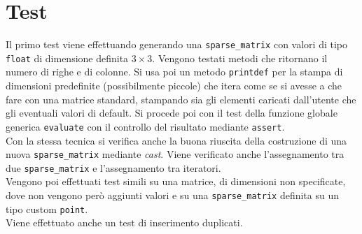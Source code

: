 \documentclass[a4paper,12pt, oneside]{article}
\begin{document}
\section*{Test}
Il primo test viene effettuando generando una \texttt{sparse\_matrix}
con valori di tipo \texttt{float} di dimensione definita $3\times
3$. Vengono testati metodi che ritornano il numero di righe e di
colonne. Si usa poi un metodo \texttt{printdef} per la stampa di
dimensioni predefinite (possibilmente piccole) che itera come se si
avesse a che fare con una matrice standard, stampando sia gli elementi
caricati dall'utente che gli eventuali valori di default. Si procede
poi con il test della funzione globale generica \texttt{evaluate} con
il controllo del risultato mediante \texttt{assert}.\\
Con la stessa tecnica si verifica anche la buona riuscita della
costruzione di una nuova \texttt{sparse\_matrix} mediante
\textit{cast}. Viene verificato anche l'assegnamento tra due
\texttt{sparse\_matrix} e l'assegnamento tra iteratori.\\
Vengono poi effettuati test simili su una matrice, di dimensioni non
specificate, dove non vengono però aggiunti valori e su una
\texttt{sparse\_matrix} definita su un tipo custom \texttt{point}.\\
Viene effettuato anche un test di inserimento duplicati.
\end{document}

